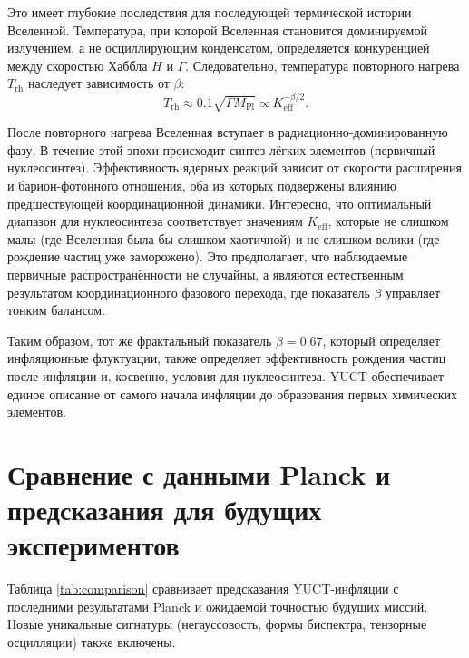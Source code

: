 \documentclass[12pt,a4paper]{article}
\theoremstyle{remark}
\newcommand{\Keff}{K_{\mathrm{eff}}}
\begin{document}
	Это имеет глубокие последствия для последующей термической истории Вселенной. Температура, при которой Вселенная становится доминируемой излучением, а не осциллирующим конденсатом, определяется конкуренцией между скоростью Хаббла $H$ и $\Gamma$. Следовательно, температура повторного нагрева $T_{\mathrm{rh}}$ наследует зависимость от $\beta$:
	\begin{equation}
		T_{\mathrm{rh}} \approx 0.1 \sqrt{\Gamma M_{\mathrm{Pl}}} \propto \Keff^{-\beta/2}.
		\label{eq:trh}
	\end{equation}
	
	После повторного нагрева Вселенная вступает в радиационно-доминированную фазу. В течение этой эпохи происходит синтез лёгких элементов (первичный нуклеосинтез). Эффективность ядерных реакций зависит от скорости расширения и барион-фотонного отношения, оба из которых подвержены влиянию предшествующей координационной динамики. Интересно, что оптимальный диапазон для нуклеосинтеза соответствует значениям $\Keff$, которые не слишком малы (где Вселенная была бы слишком хаотичной) и не слишком велики (где рождение частиц уже заморожено). Это предполагает, что наблюдаемые первичные распространённости не случайны, а являются естественным результатом координационного фазового перехода, где показатель $\beta$ управляет тонким балансом.
	
	Таким образом, тот же фрактальный показатель $\beta = 0.67$, который определяет инфляционные флуктуации, также определяет эффективность рождения частиц после инфляции и, косвенно, условия для нуклеосинтеза. YUCT обеспечивает единое описание от самого начала инфляции до образования первых химических элементов.
	
	\section{Сравнение с данными Planck и предсказания для будущих экспериментов}
	\label{sec:comparison}
	
	Таблица \ref{tab:comparison} сравнивает предсказания YUCT-инфляции с последними результатами Planck и ожидаемой точностью будущих миссий. Новые уникальные сигнатуры (негауссовость, формы биспектра, тензорные осцилляции) также включены.
	
\end{document}
